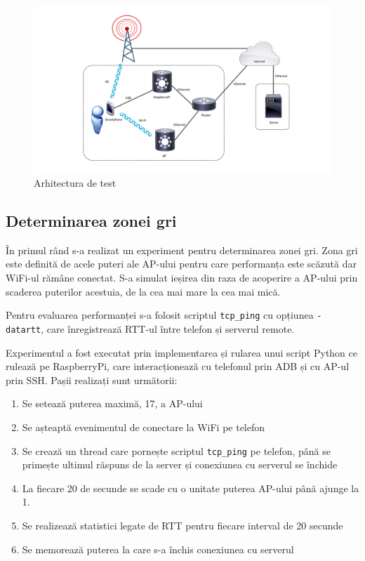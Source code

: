 \begin{figure}[h!]
 	\includegraphics[scale=0.45]{figures/experiments/45G_Topology.pdf} 
	\caption{Arhitectura de test}
	\label{fig:topologie}
\end{figure}

\subsection{Determinarea zonei gri}

În primul rând s-a realizat un experiment pentru determinarea zonei gri. Zona gri este definită de acele puteri ale AP-ului pentru care performanța este scăzută dar WiFi-ul rămâne conectat. S-a simulat ieșirea din raza de acoperire a AP-ului prin scaderea puterilor acestuia, de la cea mai mare la cea mai mică. 

Pentru evaluarea performanței s-a folosit scriptul \texttt{tcp\_ping} cu opțiunea \texttt{-datartt}, care înregistrează RTT-ul între telefon și serverul remote. 

Experimentul a fost executat prin implementarea și rularea unui script Python ce rulează pe RaspberryPi, care interacționează cu telefonul prin ADB și cu AP-ul prin SSH. Pașii realizați sunt următorii:
\begin{enumerate}
	\item Se setează puterea maximă, 17,  a AP-ului
	\item Se așteaptă evenimentul de conectare la WiFi pe telefon
	\item Se crează un thread care pornește scriptul \texttt{tcp\_ping} pe telefon, până se primește ultimul răspuns de la server și conexiunea cu serverul se închide
	\item La fiecare 20 de secunde se scade cu o unitate puterea AP-ului până ajunge la 1.
	\item Se realizează statistici legate de RTT pentru fiecare interval de 20 secunde
	\item Se memorează puterea la care s-a închis conexiunea cu serverul 
\end{enumerate}


